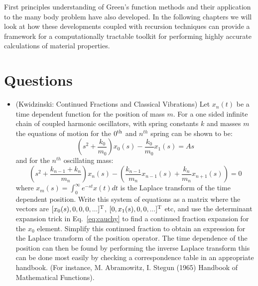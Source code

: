 First principles understanding of Green's function methods and their application to the many body
problem have also developed. In the following chapters we will look at how these developments
coupled with recursion techniques can provide a framework for a computationally tractable 
toolkit for performing highly accurate calculations of material properties.

\section{Questions}
\begin{itemize}
\item (Kwidzinski: Continued Fractions and Classical Vibrations) 
      Let $x_{n}(t)$ be a time dependent function for the position of mass $m$.
      For a one sided infinite chain of coupled harmonic oscillators, with 
      spring constants $k$ and masses $m$ the equations of motion for the $0^{\rm th}$ and
      $n^{th}$ spring can be shown to be:
      \begin{equation}
      (s^{2} + \frac{k_{0}}{m_{0}}) x_{0}(s) - \frac{k_{0}}{m_{0}}x_{1}(s) = As 
      \end{equation}
      and for the $n^{th}$ oscillating mass:
      \begin{equation}
      (s^{2}+\frac{k_{n-1}+k_{n}}{m_{n}})x_{n}(s)-(\frac{k_{n-1}}{m_{n}}x_{n-1}(s) + \frac{k_{n}}{m_{n}}x_{n+1}(s)) = 0
      \end{equation}
      where $x_{m}(s) = \int_{0}^{\infty}e^{-st}x(t)dt$ is the Laplace transform of the time dependent position.
      Write this system of equations as a matrix where the vectors 
      are $[x_{0}(s), 0, 0, 0,...]^{\rm T}$, $[0, x_{1}(s), 0, 0, ...]^{\rm T}$ etc,
      and use the determinant expansion trick in Eq.~\ref{eq:cauchy} to find a 
      continued fraction expansion for the $x_{0}$ element.
      Simplify this continued fraction to obtain an expression for the Laplace 
      transform of the position operator.
      The time dependence of the position can then be found by performing the inverse Laplace transform
      this can be done most easily by checking a correspondence table
      in an appropriate handbook. (For instance, M. Abramowitz, I. Stegun (1965) 
      Handbook of Mathematical Functions).


\end{itemize}
